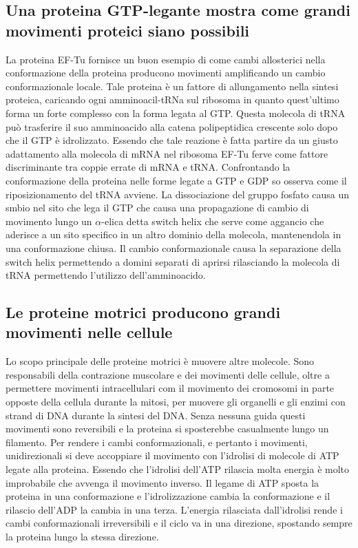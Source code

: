\subsection{Una proteina GTP-legante mostra come grandi movimenti proteici siano possibili}
La proteina EF-Tu fornisce un buon esempio di come cambi allosterici nella conformazione della proteina producono movimenti amplificando un cambio conformazionale locale. Tale proteina
\`e un fattore di allungamento nella sintesi proteica, caricando ogni amminoacil-tRNa sul ribosoma in quanto quest'ultimo forma un forte complesso con la forma legata al GTP. Questa 
molecola di tRNA pu\`o trasferire il suo amminoacido alla catena polipeptidica crescente solo dopo che il GTP \`e idrolizzato. Essendo che tale reazione \`e fatta partire da un giusto
adattamento alla molecola di mRNA nel ribosoma EF-Tu ferve come fattore discriminante tra coppie errate di mRNA e tRNA. Confrontando la conformazione della proteina nelle forme legate
a GTP e GDP so osserva come il riposizionamento del tRNA avviene. La dissociazione del gruppo fosfato causa un smbio nel sito che lega il GTP che causa una propagazione di cambio di 
movimento lungo un $\alpha$-elica detta switch helix che serve come aggancio che aderisce a un sito specifico in un altro dominio della molecola, mantenendola in una conformazione 
chiusa. Il cambio conformazionale causa la separazione della switch helix permettendo a domini separati di aprirsi rilasciando la molecola di tRNA permettendo l'utilizzo 
dell'amminoacido. 
\subsection{Le proteine motrici producono grandi movimenti nelle cellule}
Lo scopo principale delle proteine motrici \`e muovere altre molecole. Sono responsabili della contrazione muscolare e dei movimenti delle cellule, oltre a permettere movimenti 
intracellulari com il movimento dei cromosomi in parte opposte della cellula durante la mitosi, per muovere gli organelli e gli enzimi con strand di DNA durante la sintesi del DNA. 
Senza nessuna guida questi movimenti sono reversibili e la proteina si sposterebbe casualmente lungo un filamento. Per rendere i cambi conformazionali, e pertanto i movimenti, 
unidirezionali si deve accoppiare il movimento con l'idrolisi di molecole di ATP legate alla proteina. Essendo che l'idrolisi dell'ATP rilascia molta energia \`e molto improbabile che
avvenga il movimento inverso. Il legame di ATP sposta la proteina in una conformazione e l'idrolizzazione cambia la conformazione e il rilascio dell'ADP la cambia in una terza. L'energia
rilasciata dall'idrolisi rende i cambi conformazionali irreversibili e il ciclo va in una direzione, spostando sempre la proteina lungo la stessa direzione. 
